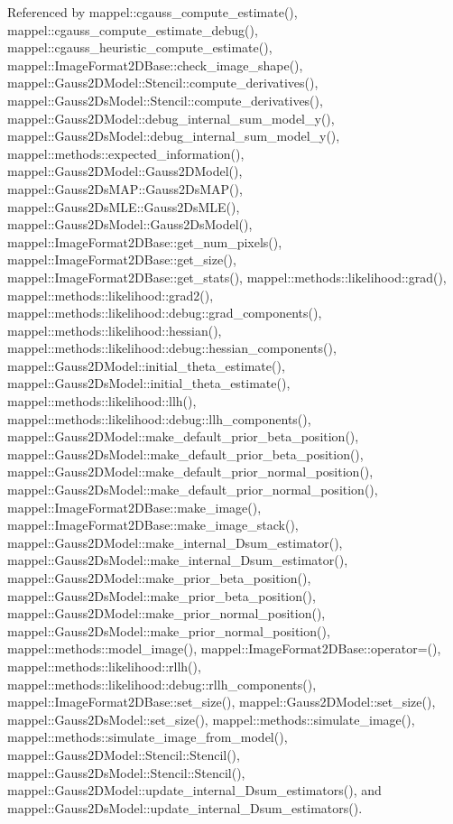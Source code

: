 Referenced by mappel\+::cgauss\+\_\+compute\+\_\+estimate(), mappel\+::cgauss\+\_\+compute\+\_\+estimate\+\_\+debug(), mappel\+::cgauss\+\_\+heuristic\+\_\+compute\+\_\+estimate(), mappel\+::\+Image\+Format2\+D\+Base\+::check\+\_\+image\+\_\+shape(), mappel\+::\+Gauss2\+D\+Model\+::\+Stencil\+::compute\+\_\+derivatives(), mappel\+::\+Gauss2\+Ds\+Model\+::\+Stencil\+::compute\+\_\+derivatives(), mappel\+::\+Gauss2\+D\+Model\+::debug\+\_\+internal\+\_\+sum\+\_\+model\+\_\+y(), mappel\+::\+Gauss2\+Ds\+Model\+::debug\+\_\+internal\+\_\+sum\+\_\+model\+\_\+y(), mappel\+::methods\+::expected\+\_\+information(), mappel\+::\+Gauss2\+D\+Model\+::\+Gauss2\+D\+Model(), mappel\+::\+Gauss2\+Ds\+M\+A\+P\+::\+Gauss2\+Ds\+M\+A\+P(), mappel\+::\+Gauss2\+Ds\+M\+L\+E\+::\+Gauss2\+Ds\+M\+L\+E(), mappel\+::\+Gauss2\+Ds\+Model\+::\+Gauss2\+Ds\+Model(), mappel\+::\+Image\+Format2\+D\+Base\+::get\+\_\+num\+\_\+pixels(), mappel\+::\+Image\+Format2\+D\+Base\+::get\+\_\+size(), mappel\+::\+Image\+Format2\+D\+Base\+::get\+\_\+stats(), mappel\+::methods\+::likelihood\+::grad(), mappel\+::methods\+::likelihood\+::grad2(), mappel\+::methods\+::likelihood\+::debug\+::grad\+\_\+components(), mappel\+::methods\+::likelihood\+::hessian(), mappel\+::methods\+::likelihood\+::debug\+::hessian\+\_\+components(), mappel\+::\+Gauss2\+D\+Model\+::initial\+\_\+theta\+\_\+estimate(), mappel\+::\+Gauss2\+Ds\+Model\+::initial\+\_\+theta\+\_\+estimate(), mappel\+::methods\+::likelihood\+::llh(), mappel\+::methods\+::likelihood\+::debug\+::llh\+\_\+components(), mappel\+::\+Gauss2\+D\+Model\+::make\+\_\+default\+\_\+prior\+\_\+beta\+\_\+position(), mappel\+::\+Gauss2\+Ds\+Model\+::make\+\_\+default\+\_\+prior\+\_\+beta\+\_\+position(), mappel\+::\+Gauss2\+D\+Model\+::make\+\_\+default\+\_\+prior\+\_\+normal\+\_\+position(), mappel\+::\+Gauss2\+Ds\+Model\+::make\+\_\+default\+\_\+prior\+\_\+normal\+\_\+position(), mappel\+::\+Image\+Format2\+D\+Base\+::make\+\_\+image(), mappel\+::\+Image\+Format2\+D\+Base\+::make\+\_\+image\+\_\+stack(), mappel\+::\+Gauss2\+D\+Model\+::make\+\_\+internal\+\_\+Dsum\+\_\+estimator(), mappel\+::\+Gauss2\+Ds\+Model\+::make\+\_\+internal\+\_\+Dsum\+\_\+estimator(), mappel\+::\+Gauss2\+D\+Model\+::make\+\_\+prior\+\_\+beta\+\_\+position(), mappel\+::\+Gauss2\+Ds\+Model\+::make\+\_\+prior\+\_\+beta\+\_\+position(), mappel\+::\+Gauss2\+D\+Model\+::make\+\_\+prior\+\_\+normal\+\_\+position(), mappel\+::\+Gauss2\+Ds\+Model\+::make\+\_\+prior\+\_\+normal\+\_\+position(), mappel\+::methods\+::model\+\_\+image(), mappel\+::\+Image\+Format2\+D\+Base\+::operator=(), mappel\+::methods\+::likelihood\+::rllh(), mappel\+::methods\+::likelihood\+::debug\+::rllh\+\_\+components(), mappel\+::\+Image\+Format2\+D\+Base\+::set\+\_\+size(), mappel\+::\+Gauss2\+D\+Model\+::set\+\_\+size(), mappel\+::\+Gauss2\+Ds\+Model\+::set\+\_\+size(), mappel\+::methods\+::simulate\+\_\+image(), mappel\+::methods\+::simulate\+\_\+image\+\_\+from\+\_\+model(), mappel\+::\+Gauss2\+D\+Model\+::\+Stencil\+::\+Stencil(), mappel\+::\+Gauss2\+Ds\+Model\+::\+Stencil\+::\+Stencil(), mappel\+::\+Gauss2\+D\+Model\+::update\+\_\+internal\+\_\+Dsum\+\_\+estimators(), and mappel\+::\+Gauss2\+Ds\+Model\+::update\+\_\+internal\+\_\+Dsum\+\_\+estimators().

